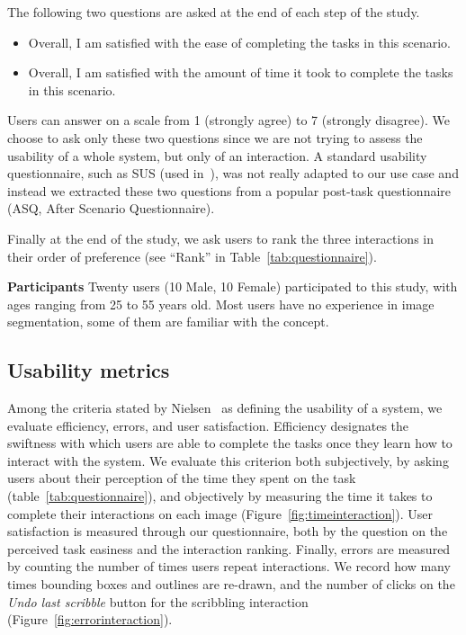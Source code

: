 The following two questions are asked at the end of each step of the study.
\vspace{-1em}
\begin{itemize}
\setlength\itemsep{-0.5em}
\item Overall, I am satisfied with the ease of
 completing the tasks in this scenario.
\item Overall, I am satisfied with the amount of time
 it took to complete the tasks in this scenario.
\end{itemize}
Users can answer on a scale
from 1 (strongly agree) to 7 (strongly disagree).
We choose to ask only these two questions since we are not trying
to assess the usability of a whole system, but only of an interaction.
A standard usability questionnaire,
such as SUS (used in~\cite{korinke_exploring_2015}),
was not really adapted to our use case and instead
we extracted these two questions from a popular post-task questionnaire
(ASQ, After Scenario Questionnaire).


Finally at the end of the study, we ask users to rank
the three interactions in their order of preference
(see ``Rank'' in Table~\ref{tab:questionnaire}).


\textbf{Participants}
Twenty users (10 Male, 10 Female) participated to this study,
with ages ranging from 25 to 55 years old.
Most users have no experience in image segmentation,
some of them are familiar with the concept.


\subsection{Usability metrics}


Among the criteria stated by Nielsen~\cite{nielsen1994usability}
as defining the usability of a system,
we evaluate efficiency, errors, and user satisfaction.
Efficiency designates the swiftness with which users are able
to complete the tasks once they learn how to interact with the system.
We evaluate this criterion both subjectively,
by asking users about their perception of the time
they spent on the task (table~\ref{tab:questionnaire}),
and objectively by measuring the time it takes to complete their
interactions on each image (Figure~\ref{fig:timeinteraction}).
User satisfaction is measured through our questionnaire,
both by the question on the perceived task easiness
and the interaction ranking.
Finally, errors are measured by counting the number of times
users repeat interactions.
We record how many times bounding boxes and outlines are re-drawn,
and the number of clicks on the \textit{Undo last scribble} button
for the scribbling interaction
(Figure~\ref{fig:errorinteraction}).


